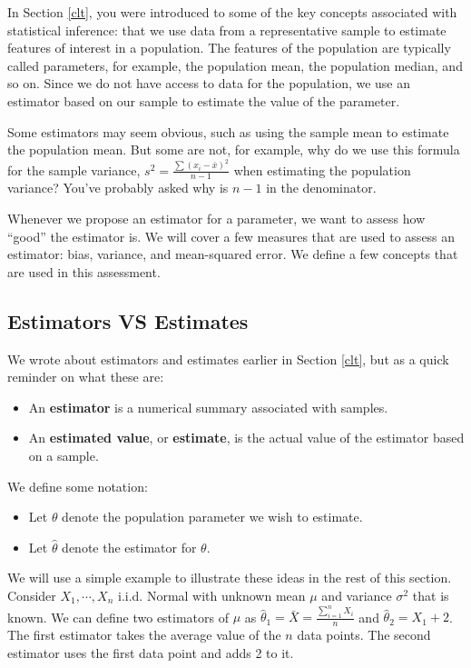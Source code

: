 \documentclass[
]{book}
\theoremstyle{definition}
\theoremstyle{definition}
\theoremstyle{definition}
\theoremstyle{definition}
\theoremstyle{remark}
\begin{document}
In Section \ref{clt}, you were introduced to some of the key concepts associated with statistical inference: that we use data from a representative sample to estimate features of interest in a population. The features of the population are typically called parameters, for example, the population mean, the population median, and so on. Since we do not have access to data for the population, we use an estimator based on our sample to estimate the value of the parameter.

Some estimators may seem obvious, such as using the sample mean to estimate the population mean. But some are not, for example, why do we use this formula for the sample variance, \(s^2 = \frac{\sum (x_i - \bar{x})^2}{n-1}\) when estimating the population variance? You've probably asked why is \(n-1\) in the denominator.

Whenever we propose an estimator for a parameter, we want to assess how ``good'' the estimator is. We will cover a few measures that are used to assess an estimator: bias, variance, and mean-squared error. We define a few concepts that are used in this assessment.

\hypertarget{estimators-vs-estimates}{%
\subsection{Estimators VS Estimates}\label{estimators-vs-estimates}}

We wrote about estimators and estimates earlier in Section \ref{clt}, but as a quick reminder on what these are:

\begin{itemize}
\item
  An \textbf{estimator} is a numerical summary associated with samples.
\item
  An \textbf{estimated value}, or \textbf{estimate}, is the actual value of the estimator based on a sample.
\end{itemize}

We define some notation:

\begin{itemize}
\item
  Let \(\theta\) denote the population parameter we wish to estimate.
\item
  Let \(\hat{\theta}\) denote the estimator for \(\theta\).
\end{itemize}

We will use a simple example to illustrate these ideas in the rest of this section. Consider \(X_1, \cdots, X_n\) i.i.d. Normal with unknown mean \(\mu\) and variance \(\sigma^2\) that is known. We can define two estimators of \(\mu\) as \(\hat{\theta}_1 = \bar{X} = \frac{\sum_{i=1}^n X_i}{n}\) and \(\hat{\theta}_2 = X_1 + 2\). The first estimator takes the average value of the \(n\) data points. The second estimator uses the first data point and adds 2 to it.
\end{document}
